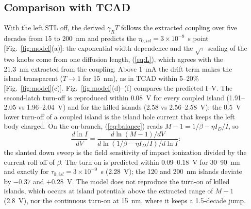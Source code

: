 \documentclass[journal]{IEEEtran}
\begin{document}
\subsection{Comparison with TCAD}
With the left STL off, the derived $\gamma_RT$ follows the extracted coupling over five decades from 15 to 200~nm and predicts the $\tau_{0,isl}=3\times10^{-9}$~s point [Fig.~\ref{fig:model}(a)]: the exponential width dependence and the $\sqrt{\tau}$ scaling of the two knobs come from one diffusion length, (\ref{eq:L}), which agrees with the 21.3~nm extracted from the coupling. Above 1~mA the drift term makes the island transparent ($T\rightarrow1$ for 15~nm), as in TCAD within 5--20\% [Fig.~\ref{fig:model}(c)]. Fig.~\ref{fig:model}(d)--(f) compares the predicted I--V. The second-latch turn-off is reproduced within 0.08~V for every coupled island (1.91--2.05 vs 1.96--2.04~V) and for the killed islands (2.58 vs 2.56--2.58~V): the 0.5~V lower turn-off of a coupled island is the island hole current that keeps the left body charged. On the on-branch, (\ref{eq:balance}) reads $M-1=1/\beta-\eta I_D/I$, so
\begin{equation}
\frac{d\ln I}{dV}=\frac{d\ln(M-1)/dV}{d\ln(1/\beta-\eta I_D/I)/d\ln I}:
\label{eq:slope}
\end{equation}
the slanted down sweep is the field sensitivity of impact ionization divided by the current roll-off of $\beta$. The turn-on is predicted within 0.09--0.18~V for 30--90~nm and exactly for $\tau_{0,isl}=3\times10^{-9}$~s (2.28~V); the 120 and 200~nm islands deviate by $-0.37$ and $+0.28$~V. The model does not reproduce the turn-on of killed islands, which occurs at island potentials above the extracted range of $M-1$ (2.8~V), nor the continuous turn-on at 15~nm, where it keeps a 1.5-decade jump.
\end{document}
